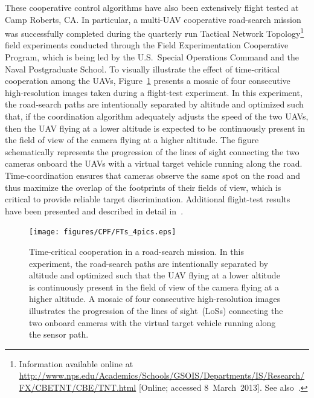 \documentclass[letter,onecolumn,12pt]{aiaa-tc}
\newcommand{\1}{1_n}
\begin{document}
These cooperative control algorithms have also been extensively flight tested at Camp Roberts, CA. In particular, a multi-UAV cooperative road-search mission was successfully completed during the quarterly run Tactical Network Topology\footnote{Information available online at \url{http://www.nps.edu/Academics/Schools/GSOIS/Departments/IS/Research/FX/CBETNT/CBE/TNT.html} [Online; accessed 8~March~2013]. See also~\cite{netzer09_TNT}.} field experiments conducted through the Field Experimentation Cooperative Program, which is being led by the U.S.~Special Operations Command and the Naval Postgraduate School. To visually illustrate the effect of time-critical cooperation among the UAVs, Figure~\ref{fig:FTs.coordframes} presents a mosaic of four consecutive high-resolution images taken during a flight-test experiment. In this experiment, the road-search paths are intentionally separated by altitude and optimized such that, if the coordination algorithm adequately adjusts the speed of the two UAVs, then the UAV flying at a lower altitude is expected to be continuously present in the field of view of the camera flying at a higher altitude. The figure schematically represents the progression of the lines of sight connecting the two cameras onboard the UAVs with a virtual target vehicle running along the road. Time-coordination ensures that cameras observe the same spot on the road and thus maximize the overlap of the footprints of their fields of view, which is critical to provide reliable target discrimination. Additional flight-test results have been presented and described in detail in~\cite{CSM12_CPF}.


\begin{figure}[h]
    \centering
    \texttt{[image: figures/CPF/FTs\_4pics.eps]}
    \vspace{3mm}
    \caption[Time-critical cooperation in a road-search mission.]{Time-critical cooperation in a road-search mission. In this experiment, the road-search paths are intentionally separated by altitude and optimized such that the UAV flying at a lower altitude is continuously present in the field of view of the camera flying at a higher altitude. A mosaic of four consecutive high-resolution images illustrates the progression of the lines of sight~(LoSs) connecting the two onboard cameras with the virtual target vehicle running along the sensor path.}
    \label{fig:FTs.coordframes}
\end{figure}
\end{document}
